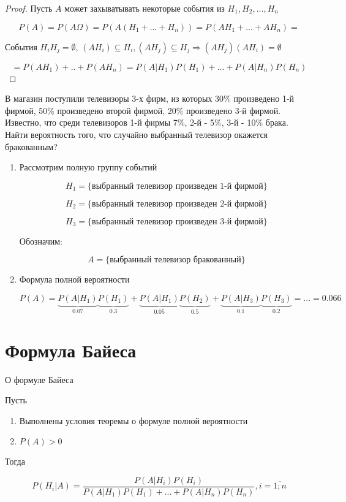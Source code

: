\documentclass[a4paper, 14pt]{report}
\begin{document}
\begin{proof}
   Пусть $A$ может захыватывать некоторые события из $H_1,H_2,...,H_n$

   $$
   P(A) = P(A \Omega) = P(A(H_1+...+H_n)) = P(AH_1 + ... + AH_n) = 
   $$

   События $H_iH_j = \emptyset$, $(AH_i) \subseteq H_i, (AH_j) \subseteq H_j  \Rightarrow (AH_j)(AH_i) = \emptyset$

   $$
   = P(AH_1) + .. + P(AH_n) = P(A|H_1)P(H_1) + ... + P(A|H_n)P(H_n)
   $$
\end{proof}

В магазин поступили телевизоры 3-х фирм, из которых 30\% произведено 1-й фирмой, 50\% произведено второй фирмой, 20\% произведено 3-й фирмой. Известно, что среди телевизоров 1-й фирмы 7\%, 2-й - 5\%, 3-й - 10\% брака. Найти вероятность того, что случайно выбранный телевизор окажется бракованным?

\begin{enumerate}
    \item Рассмотрим полную группу событий

        $$
        H_1 = \{ \text{выбранный телевизор произведен 1-й фирмой} \}
        $$


        $$
        H_2 = \{ \text{выбранный телевизор произведен 2-й фирмой} \}
        $$


        $$
        H_3 = \{ \text{выбранный телевизор произведен 3-й фирмой} \}
        $$

        Обозначим:

        $$
        A = \{ \text{выбранный телевизор бракованный} \}
        $$

    \item Формула полной вероятности

        $$
        P(A) = \underbrace{P(A|H_1)}_{0.07} \underbrace{P(H_1)}_{0.3} + \underbrace{P(A|H_1)}_{0.05} \underbrace{P(H_2)}_{0.5} + \underbrace{P(A|H_3)}_{0.1} \underbrace{P(H_3)}_{0.2} = ... = 0.066
        $$
\end{enumerate}

\section{Формула Байеса}

\begin{theorem}
    О формуле Байеса

    Пусть

    \begin{enumerate}
        \item Выполнены условия теоремы о формуле полной вероятности
        \item $P(A) > 0$
    \end{enumerate}

    Тогда

    $$
    P(H_i|A) = \frac{P(A|H_i) P(H_i)}{P(A|H_1) P(H_1) + ... + P(A|H_n) P(H_n) }, i = \overline{1;n}
    $$
\end{theorem}
\end{document}
